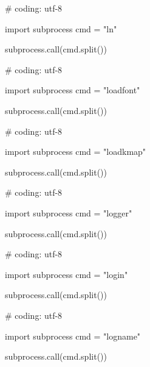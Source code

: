 \begin{mylisting}[label={lst:acpid},language=sh,caption=ln]

# coding: utf-8

import subprocess
cmd = "ln"

subprocess.call(cmd.split())

\end{mylisting}

\begin{mylisting}[label={lst:acpid},language=sh,caption=loadfont]

# coding: utf-8

import subprocess
cmd = "loadfont"

subprocess.call(cmd.split())

\end{mylisting}

\begin{mylisting}[label={lst:acpid},language=sh,caption=loadkmap]

# coding: utf-8

import subprocess
cmd = "loadkmap"

subprocess.call(cmd.split())

\end{mylisting}

\begin{mylisting}[label={lst:acpid},language=sh,caption=logger]

# coding: utf-8

import subprocess
cmd = "logger"

subprocess.call(cmd.split())

\end{mylisting}

\begin{mylisting}[label={lst:acpid},language=sh,caption=login]

# coding: utf-8

import subprocess
cmd = "login"

subprocess.call(cmd.split())

\end{mylisting}

\begin{mylisting}[label={lst:acpid},language=sh,caption=logname]

# coding: utf-8

import subprocess
cmd = "logname"

subprocess.call(cmd.split())

\end{mylisting}

